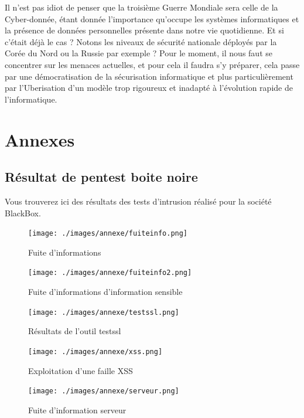 \documentclass[a4paper]{memoir}
\begin{document}
Il n'est pas idiot de penser que la troisième Guerre Mondiale sera celle de la Cyber-donnée, étant donnée l'importance qu'occupe les systèmes informatiques et la présence de données personnelles présente dans notre vie quotidienne. Et si c'était déjà le cas ? Notons les niveaux de sécurité nationale déployés par la Corée du Nord ou la Russie par exemple ? 
Pour le moment, il nous faut se concentrer sur les menaces actuelles, et pour cela il faudra s'y préparer, cela passe par une démocratisation de la sécurisation informatique et plus particulièrement par l'Uberisation d'un modèle trop rigoureux et inadapté à l'évolution rapide de l'informatique.



\part*{Annexes}
\appendix

\chapter{Résultat de pentest boite noire}

Vous trouverez ici des résultats des tests d'intrusion réalisé pour la société BlackBox.\\

\begin{figure}[!ht]
\center
\texttt{[image: ./images/annexe/fuiteinfo.png]}
\caption{Fuite d'informations}
\end{figure}

\begin{figure}[!ht]
\center
\texttt{[image: ./images/annexe/fuiteinfo2.png]}
\caption{Fuite d'informations d'information sensible}
\end{figure}

\begin{figure}[!ht]
\center
\texttt{[image: ./images/annexe/testssl.png]}
\caption{Résultats de l'outil testssl}
\end{figure}

\begin{figure}[!ht]
\center
\texttt{[image: ./images/annexe/xss.png]}
\caption{Exploitation d'une faille XSS}
\end{figure}

\begin{figure}[!ht]
\center
\texttt{[image: ./images/annexe/serveur.png]}
\caption{Fuite d'information serveur}
\end{figure}


\backmatter%

\nocite{*}






\printindex
\end{document}
